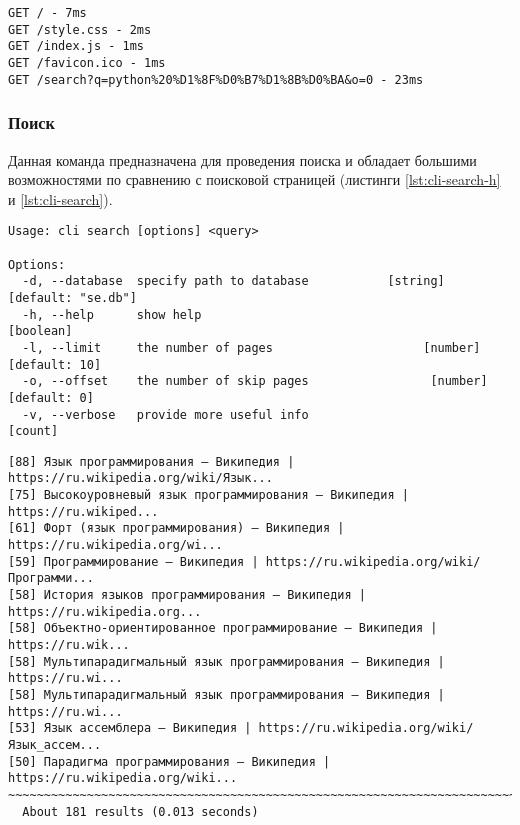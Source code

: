 \begin{lstlisting}[caption=Интерфейс командной строки: сервер., label=lst:cli-server]
GET / - 7ms
GET /style.css - 2ms
GET /index.js - 1ms
GET /favicon.ico - 1ms
GET /search?q=python%20%D1%8F%D0%B7%D1%8B%D0%BA&o=0 - 23ms
\end{lstlisting}


\subsubsection*{Поиск}
Данная команда предназначена для проведения поиска и обладает большими возможностями по сравнению с поисковой страницей (листинги \ref{lst:cli-search-h} и \ref{lst:cli-search}).
\begin{lstlisting}[caption=Интерфейс командной строки: поиск., label=lst:cli-search-h]
Usage: cli search [options] <query>

Options:
  -d, --database  specify path to database           [string] [default: "se.db"]
  -h, --help      show help                                            [boolean]
  -l, --limit     the number of pages                     [number] [default: 10]
  -o, --offset    the number of skip pages                 [number] [default: 0]
  -v, --verbose   provide more useful info                               [count]
\end{lstlisting}

\begin{lstlisting}[caption=Интерфейс командной строки: поиск., label=lst:cli-search]
[88] Язык программирования — Википедия | https://ru.wikipedia.org/wiki/Язык...
[75] Высокоуровневый язык программирования — Википедия | https://ru.wikiped...
[61] Форт (язык программирования) — Википедия | https://ru.wikipedia.org/wi...
[59] Программирование — Википедия | https://ru.wikipedia.org/wiki/Программи...
[58] История языков программирования — Википедия | https://ru.wikipedia.org...
[58] Объектно-ориентированное программирование — Википедия | https://ru.wik...
[58] Мультипарадигмальный язык программирования — Википедия | https://ru.wi...
[58] Мультипарадигмальный язык программирования — Википедия | https://ru.wi...
[53] Язык ассемблера — Википедия | https://ru.wikipedia.org/wiki/Язык_ассем...
[50] Парадигма программирования — Википедия | https://ru.wikipedia.org/wiki...
~~~~~~~~~~~~~~~~~~~~~~~~~~~~~~~~~~~~~~~~~~~~~~~~~~~~~~~~~~~~~~~~~~~~~~~~~~~~~~
  About 181 results (0.013 seconds)
\end{lstlisting}

